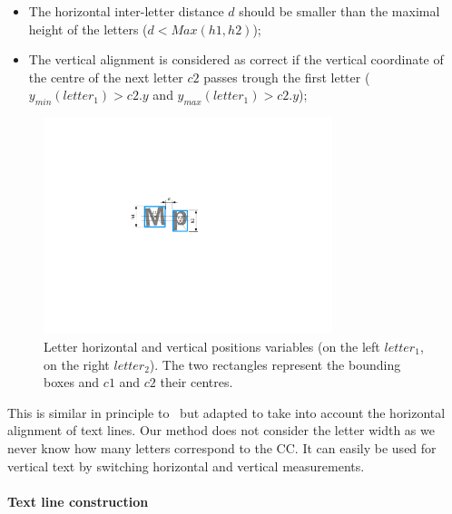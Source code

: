 \begin{itemize}
    \item The horizontal inter-letter distance $d$ should be smaller than the maximal height of the letters ($d<Max(h1,h2)$);
    \item The vertical alignment is considered as correct if the vertical coordinate of the centre of the next letter $c2$ passes trough the first letter ($y_{min}(letter_1)>c2.y$ and $y_{max}(letter_1)>c2.y$);
\end{itemize}


	\begin{figure}[h!]	%
	  \centering
		\includegraphics[trim= 200px 280px 300px 220px, clip, width=0.75\textwidth]{letter_position.pdf}
		\caption[Text letter horizontal and vertical alignments]{Letter horizontal and vertical positions variables (on the left $letter_1$, on the right $letter_2$). The two rectangles represent the bounding boxes and $c1$ and $c2$ their centres.}
		\label{fig:se:letter_position}
	\end{figure}


 This is similar in principle to~\cite{Clavelli09} but adapted to take into account the horizontal alignment of text lines. Our method does not consider the letter width as we never know how many letters correspond to the CC.
 It can easily be used for vertical text by switching horizontal and vertical measurements.





\paragraph{Text line construction} %
\label{par:se:letter_to_line}

